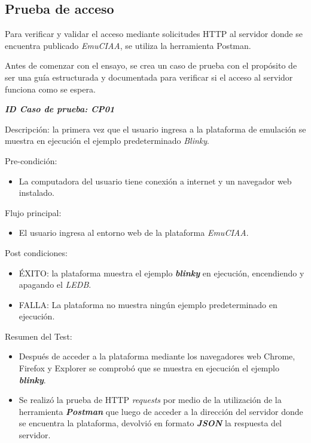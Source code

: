 \hfill \break
\hfill \break
\hfill \break
\hfill \break
\hfill \break

\subsection{Prueba de acceso}    

Para verificar y validar el acceso mediante solicitudes HTTP al servidor donde se encuentra publicado \textit{EmuCIAA}, se utiliza la herramienta Postman.

Antes de comenzar con el ensayo, se crea un caso de prueba con el propósito de ser una guía estructurada y documentada para verificar si el acceso al servidor funciona como se espera.

\textit{\textbf{ID Caso de prueba: CP01}}

Descripción: la primera vez que el usuario ingresa a la plataforma de emulación se muestra en ejecución el ejemplo predeterminado \textit{Blinky}.

Pre-condición: 
\begin{itemize}
    \item La computadora del usuario tiene conexión a internet y un navegador web instalado.
\end{itemize}

Flujo principal:
\begin{itemize}
    \item El usuario ingresa al entorno web de la plataforma \textit{EmuCIAA}.
\end{itemize}

Post condiciones:
\begin{itemize}
    \item ÉXITO: la plataforma muestra el ejemplo \textit{\textbf{blinky}} en ejecución, encendiendo y apagando el \textit{LEDB}.
    \item FALLA: La plataforma no muestra ningún ejemplo predeterminado en ejecución.
\end{itemize}

Resumen del Test:
\begin{itemize}
    \item Después de acceder a la plataforma mediante los navegadores web Chrome, Firefox y Explorer se comprobó que se muestra en ejecución el ejemplo \textit{\textbf{blinky}}.
    \item Se realizó la prueba de HTTP \textit{requests} por medio de la utilización de la herramienta \textit{\textbf{Postman}} que luego de acceder a la dirección del servidor donde se encuentra la plataforma, devolvió en formato \textit{\textbf{JSON}} la respuesta del servidor.
\end{itemize}

